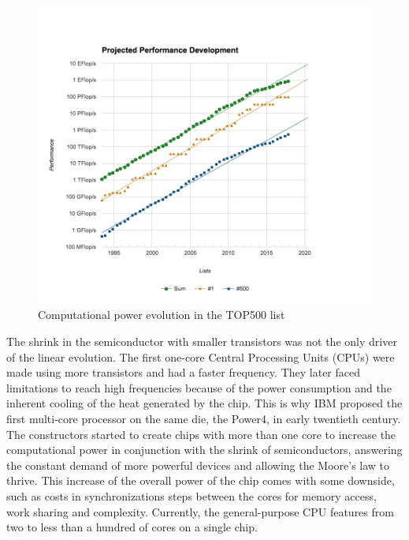 \begin{figure}
\includegraphics[width=\linewidth]{figures/introduction/top500_list_approximation.png}
\caption{Computational power evolution in the TOP500 list}
\label{fig:intro_top500}
\end{figure}

The shrink in the semiconductor with smaller transistors was not the only driver of the linear evolution.
The first one-core Central Processing Units (CPUs) were made using more transistors and had a faster frequency.
They later faced limitations to reach high frequencies because of the power consumption and the inherent cooling of the heat generated by the chip.
This is why IBM proposed the first multi-core processor on the same die, the Power4, in early twentieth century.
The constructors started to create chips with more than one core to increase the computational power in conjunction with the shrink of semiconductors, answering the constant demand of more powerful devices and allowing the Moore's law to thrive. 
This increase of the overall power of the chip comes with some downside, such as costs in synchronizations steps between the cores for memory access, work sharing and complexity.
Currently, the general-purpose CPU features from two to less than a hundred of cores on a single chip.\\

